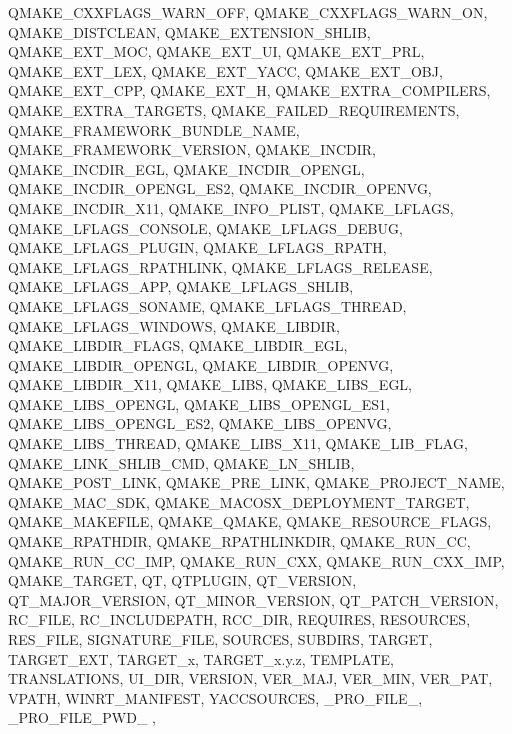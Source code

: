{{            QMAKE_CXXFLAGS_WARN_OFF,
            QMAKE_CXXFLAGS_WARN_ON,
            QMAKE_DISTCLEAN,
            QMAKE_EXTENSION_SHLIB,
            QMAKE_EXT_MOC,
            QMAKE_EXT_UI,
            QMAKE_EXT_PRL,
            QMAKE_EXT_LEX,
            QMAKE_EXT_YACC,
            QMAKE_EXT_OBJ,
            QMAKE_EXT_CPP,
            QMAKE_EXT_H,
            QMAKE_EXTRA_COMPILERS,
            QMAKE_EXTRA_TARGETS,
            QMAKE_FAILED_REQUIREMENTS,
            QMAKE_FRAMEWORK_BUNDLE_NAME,
            QMAKE_FRAMEWORK_VERSION,
            QMAKE_INCDIR,
            QMAKE_INCDIR_EGL,
            QMAKE_INCDIR_OPENGL,
            QMAKE_INCDIR_OPENGL_ES2,
            QMAKE_INCDIR_OPENVG,
            QMAKE_INCDIR_X11,
            QMAKE_INFO_PLIST,
            QMAKE_LFLAGS,
            QMAKE_LFLAGS_CONSOLE,
            QMAKE_LFLAGS_DEBUG,
            QMAKE_LFLAGS_PLUGIN,
            QMAKE_LFLAGS_RPATH,
            QMAKE_LFLAGS_RPATHLINK,
            QMAKE_LFLAGS_RELEASE,
            QMAKE_LFLAGS_APP,
            QMAKE_LFLAGS_SHLIB,
            QMAKE_LFLAGS_SONAME,
            QMAKE_LFLAGS_THREAD,
            QMAKE_LFLAGS_WINDOWS,
            QMAKE_LIBDIR,
            QMAKE_LIBDIR_FLAGS,
            QMAKE_LIBDIR_EGL,
            QMAKE_LIBDIR_OPENGL,
            QMAKE_LIBDIR_OPENVG,
            QMAKE_LIBDIR_X11,
            QMAKE_LIBS,
            QMAKE_LIBS_EGL,
            QMAKE_LIBS_OPENGL,
            QMAKE_LIBS_OPENGL_ES1, QMAKE_LIBS_OPENGL_ES2,
            QMAKE_LIBS_OPENVG,
            QMAKE_LIBS_THREAD,
            QMAKE_LIBS_X11,
            QMAKE_LIB_FLAG,
            QMAKE_LINK_SHLIB_CMD,
            QMAKE_LN_SHLIB,
            QMAKE_POST_LINK,
            QMAKE_PRE_LINK,
            QMAKE_PROJECT_NAME,
            QMAKE_MAC_SDK,
            QMAKE_MACOSX_DEPLOYMENT_TARGET,
            QMAKE_MAKEFILE,
            QMAKE_QMAKE,
            QMAKE_RESOURCE_FLAGS,
            QMAKE_RPATHDIR,
            QMAKE_RPATHLINKDIR,
            QMAKE_RUN_CC,
            QMAKE_RUN_CC_IMP,
            QMAKE_RUN_CXX,
            QMAKE_RUN_CXX_IMP,
            QMAKE_TARGET,
            QT,
            QTPLUGIN,
            QT_VERSION,
            QT_MAJOR_VERSION,
            QT_MINOR_VERSION,
            QT_PATCH_VERSION,
            RC_FILE,
            RC_INCLUDEPATH,
            RCC_DIR,
            REQUIRES,
            RESOURCES,
            RES_FILE,
            SIGNATURE_FILE,
            SOURCES,
            SUBDIRS,
            TARGET,
            TARGET_EXT,
            TARGET_x,
            TARGET_x.y.z,
            TEMPLATE,
            TRANSLATIONS,
            UI_DIR,
            VERSION,
            VER_MAJ,
            VER_MIN,
            VER_PAT,
            VPATH,
            WINRT_MANIFEST,
            YACCSOURCES,
            _PRO_FILE_,
            _PRO_FILE_PWD_
    },
}